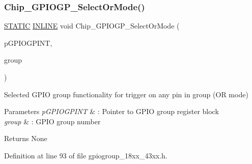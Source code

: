 \subsubsection{\texorpdfstring{Chip\+\_\+\+G\+P\+I\+O\+G\+P\+\_\+\+Select\+Or\+Mode()}{Chip\_GPIOGP\_SelectOrMode()}}
{\footnotesize\ttfamily \hyperlink{group___l_p_c___types___public___macros_ga10b2d890d871e1489bb02b7e70d9bdfb}{S\+T\+A\+T\+IC} \hyperlink{spifi__18xx__43xx_8h_a2eb6f9e0395b47b8d5e3eeae4fe0c116}{I\+N\+L\+I\+NE} void Chip\+\_\+\+G\+P\+I\+O\+G\+P\+\_\+\+Select\+Or\+Mode (\begin{DoxyParamCaption}\item[{\hyperlink{struct_l_p_c___g_p_i_o_g_r_o_u_p_i_n_t___t}{L\+P\+C\+\_\+\+G\+P\+I\+O\+G\+R\+O\+U\+P\+I\+N\+T\+\_\+T} $\ast$}]{p\+G\+P\+I\+O\+G\+P\+I\+NT,  }\item[{uint8\+\_\+t}]{group }\end{DoxyParamCaption})}



Selected G\+P\+IO group functionality for trigger on any pin in group (OR mode) 


\begin{DoxyParams}{Parameters}
{\em p\+G\+P\+I\+O\+G\+P\+I\+NT} & \+: Pointer to G\+P\+IO group register block \\
\hline
{\em group} & \+: G\+P\+IO group number \\
\hline
\end{DoxyParams}
\begin{DoxyReturn}{Returns}
None 
\end{DoxyReturn}


Definition at line 93 of file gpiogroup\+\_\+18xx\+\_\+43xx.\+h.

